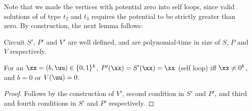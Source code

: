 Note that we made the vertices with potential zero into self loops, since valid solutions of \EOML of type $t_2$ and $t_3$ requires the potential to be strictly greater than zero. By construction, the next lemma follows:
\begin{lemma}\label{lem:m2p-valid}
Circuit $S'$, $P'$ and $V'$ are well defined, and are polynomial-time in size of $S$, $P$ and $V$ respectively. 
\end{lemma}

\begin{lemma}\label{lem:m2p-sl}
For an $\xx=(b,\uu)\in \{0,1\}^k$, $P'(\xx)=S'(\xx)=\xx$ (self loop) iff $\xx\neq 0^k$, and $b=0$ or $V(\uu)=0$.
\end{lemma}
\begin{proof}
Follows by the construction of $V'$, second condition in $S'$ and $P'$, and third and fourth conditions in $S'$ and $P'$ respectively. 
\end{proof}

